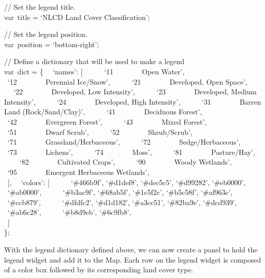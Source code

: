 \documentclass[
  letterpaper,
  DIV=11,
  numbers=noendperiod]{scrreprt}
\begin{document}
// Set the legend title.\\
var~title = `NLCD Land Cover Classification';

// Set the legend position.\\
var~position = `bottom-right';

// Define a dictionary that will be used to make a legend\\
var~dict = \{~ ~`names': {[}~ ~ ~ ~`11~~~~~~~~Open Water',~ ~ ~
~`12~~~~~~~~Perennial Ice/Snow',~ ~ ~ ~`21~~~~~~~~Developed, Open
Space',~ ~ ~ ~`22~~~~~~~~Developed, Low Intensity',~ ~ ~
~`23~~~~~~~~Developed, Medium Intensity',~ ~ ~ ~`24~~~~~~~~Developed,
High Intensity',~ ~ ~ ~`31~~~~~~~~Barren Land (Rock/Sand/Clay)',~ ~ ~
~`41~~~~~~~~Deciduous Forest',~ ~ ~ ~`42~~~~~~~~Evergreen Forest',~ ~ ~
~`43~~~~~~~~Mixed Forest',~ ~ ~ ~`51~~~~~~~~Dwarf Scrub',~ ~ ~
~`52~~~~~~~~Shrub/Scrub',~ ~ ~ ~`71~~~~~~~~Grassland/Herbaceous',~ ~ ~
~`72~~~~~~~~Sedge/Herbaceous',~ ~ ~ ~`73~~~~~~~~Lichens',~ ~ ~
~`74~~~~~~~~Moss',~ ~ ~ ~`81~~~~~~~~Pasture/Hay',~ ~ ~
~`82~~~~~~~~Cultivated Crops',~ ~ ~ ~`90~~~~~~~~Woody Wetlands',~ ~ ~
~`95~~~~~~~~Emergent Herbaceous Wetlands',\\
\hspace*{0.333em} ~{]},~ ~`colors': {[}~ ~ ~ ~`\#466b9f', `\#d1def8',
`\#dec5c5', `\#d99282', `\#eb0000',~ ~ ~ ~`\#ab0000',~ ~ ~ ~`\#b3ac9f',
`\#68ab5f', `\#1c5f2c', `\#b5c58f', `\#af963c',~ ~ ~ ~`\#ccb879',~ ~ ~
~`\#dfdfc2', `\#d1d182', `\#a3cc51', `\#82ba9e', `\#dcd939',~ ~ ~
~`\#ab6c28',~ ~ ~ ~`\#b8d9eb', `\#6c9fb8',\\
\hspace*{0.333em} ~{]}\\
\};

With the legend dictionary defined above, we can now create a panel to
hold the legend widget and add it to the Map. Each row on the legend
widget is composed of a color box followed by its corresponding land
cover type.
\end{document}
